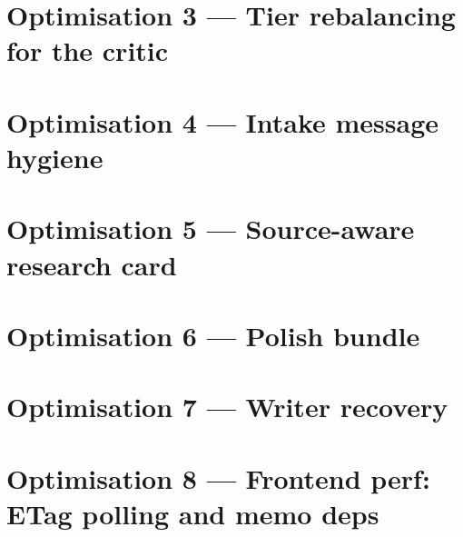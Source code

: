 \section{Optimisation 3 — Tier rebalancing for the critic}
\label{sec:opt-critic}

\section{Optimisation 4 — Intake message hygiene}
\label{sec:opt-intake}

\section{Optimisation 5 — Source-aware research card}
\label{sec:opt-sources}

\section{Optimisation 6 — Polish bundle}
\label{sec:opt-polish}

\section{Optimisation 7 — Writer recovery}
\label{sec:opt-writer-recovery}

\section{Optimisation 8 — Frontend perf: ETag polling and memo deps}
\label{sec:opt-fe-perf}

